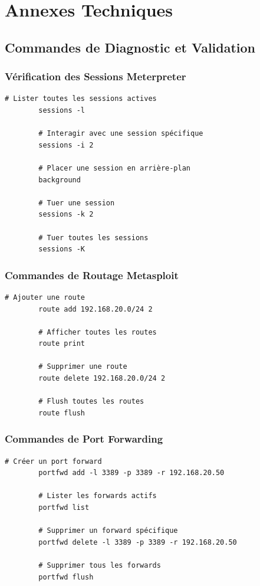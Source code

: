 \documentclass[12pt,a4paper,openany]{report}
\begin{document}
	\appendix
	\chapter{Annexes Techniques}
	
	\section{Commandes de Diagnostic et Validation}
	
	\subsection{Vérification des Sessions Meterpreter}
	\begin{lstlisting}[caption=Gestion des Sessions Metasploit]
		# Lister toutes les sessions actives
		sessions -l
		
		# Interagir avec une session spécifique
		sessions -i 2
		
		# Placer une session en arrière-plan
		background
		
		# Tuer une session
		sessions -k 2
		
		# Tuer toutes les sessions
		sessions -K
	\end{lstlisting}
	
	\subsection{Commandes de Routage Metasploit}
	\begin{lstlisting}[caption=Gestion des Routes]
		# Ajouter une route
		route add 192.168.20.0/24 2
		
		# Afficher toutes les routes
		route print
		
		# Supprimer une route
		route delete 192.168.20.0/24 2
		
		# Flush toutes les routes
		route flush
	\end{lstlisting}
	
	\subsection{Commandes de Port Forwarding}
	\begin{lstlisting}[caption=Gestion des Tunnels]
		# Créer un port forward
		portfwd add -l 3389 -p 3389 -r 192.168.20.50
		
		# Lister les forwards actifs
		portfwd list
		
		# Supprimer un forward spécifique
		portfwd delete -l 3389 -p 3389 -r 192.168.20.50
		
		# Supprimer tous les forwards
		portfwd flush
	\end{lstlisting}
	
\end{document}
